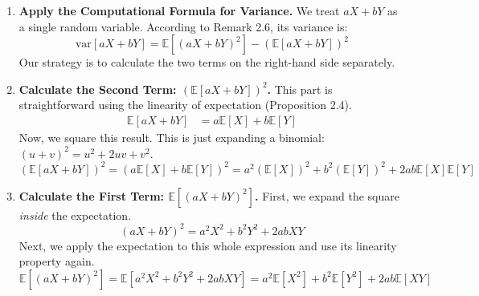 \documentclass[11pt,a4paper]{article}
\begin{document}
\begin{enumerate}
    \item \textbf{Apply the Computational Formula for Variance.}
    We treat $aX+bY$ as a single random variable. According to Remark 2.6, its variance is:
    \[
        \text{var}[aX+bY] = \mathbb{E}[(aX+bY)^2] - (\mathbb{E}[aX+bY])^2
    \]
    Our strategy is to calculate the two terms on the right-hand side separately.

    \item \textbf{Calculate the Second Term: $(\mathbb{E}[aX+bY])^2$.}
    This part is straightforward using the linearity of expectation (Proposition 2.4).
    \begin{align*}
        \mathbb{E}[aX+bY] &= a\mathbb{E}[X] + b\mathbb{E}[Y]
    \end{align*}
    Now, we square this result. This is just expanding a binomial: $(u+v)^2 = u^2 + 2uv + v^2$.
    \begin{equation} \label{eq:exp_squared}
        (\mathbb{E}[aX+bY])^2 = (a\mathbb{E}[X] + b\mathbb{E}[Y])^2 = a^2(\mathbb{E}[X])^2 + b^2(\mathbb{E}[Y])^2 + 2ab\mathbb{E}[X]\mathbb{E}[Y]
    \end{equation}

    \item \textbf{Calculate the First Term: $\mathbb{E}[(aX+bY)^2]$.}
    First, we expand the square \emph{inside} the expectation.
    \[
        (aX+bY)^2 = a^2X^2 + b^2Y^2 + 2abXY
    \]
    Next, we apply the expectation to this whole expression and use its linearity property again.
    \begin{equation} \label{eq:exp_of_square}
        \mathbb{E}[(aX+bY)^2] = \mathbb{E}[a^2X^2 + b^2Y^2 + 2abXY] = a^2\mathbb{E}[X^2] + b^2\mathbb{E}[Y^2] + 2ab\mathbb{E}[XY]
    \end{equation}


\end{enumerate}
\end{document}
